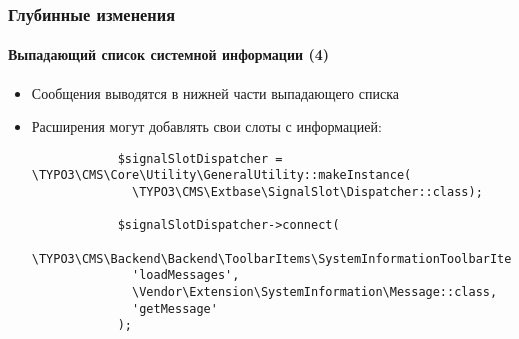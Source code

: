 \begin{frame}[fragile]
	\frametitle{Глубинные изменения}
	\framesubtitle{Выпадающий список системной информации (4)}

	\lstset{basicstyle=\tiny\ttfamily}

	\begin{itemize}

		\item Сообщения выводятся в нижней части выпадающего списка

		\item Расширения могут добавлять свои слоты с информацией:

		\begin{lstlisting}
			$signalSlotDispatcher = \TYPO3\CMS\Core\Utility\GeneralUtility::makeInstance(
			  \TYPO3\CMS\Extbase\SignalSlot\Dispatcher::class);

			$signalSlotDispatcher->connect(
			  \TYPO3\CMS\Backend\Backend\ToolbarItems\SystemInformationToolbarItem::class,
			  'loadMessages',
			  \Vendor\Extension\SystemInformation\Message::class,
			  'getMessage'
			);
		\end{lstlisting}

	\end{itemize}

\end{frame}

